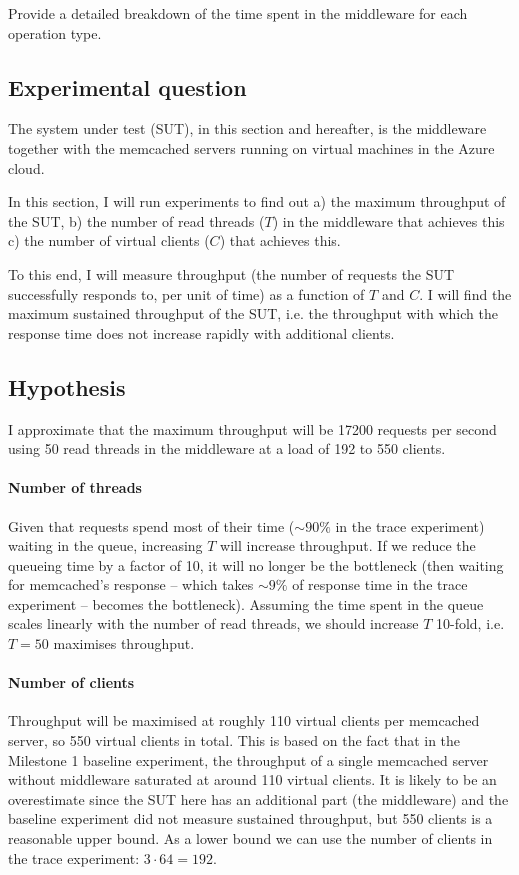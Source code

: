 \documentclass[11pt]{article}
\begin{document}
Provide a detailed breakdown of the time spent in the middleware for each operation type.

\subsection{Experimental question}

The system under test (SUT), in this section and hereafter, is the middleware together with the memcached servers running on virtual machines in the Azure cloud.

In this section, I will run experiments to find out a) the maximum throughput of the SUT, b) the number of read threads ($T$) in the middleware that achieves this c) the number of virtual clients ($C$) that achieves this.

To this end, I will measure throughput (the number of requests the SUT successfully responds to, per unit of time) as a function of $T$ and $C$. I will find the maximum sustained throughput of the SUT, i.e. the throughput with which the response time does not increase rapidly with additional clients.

\subsection{Hypothesis}

I approximate that the maximum throughput will be 17200 requests per second using 50 read threads in the middleware at a load of 192 to 550 clients.

\paragraph{Number of threads} 
Given that requests spend most of their time ($\sim90\%$ in the trace experiment) waiting in the queue, increasing $T$ will increase throughput. If we reduce the queueing time by a factor of 10, it will no longer be the bottleneck (then waiting for memcached's response -- which takes $\sim9\%$ of response time in the trace experiment -- becomes the bottleneck). Assuming the time spent in the queue scales linearly with the number of read threads, we should increase $T$ 10-fold, i.e. $T=50$ maximises throughput.

\paragraph{Number of clients} Throughput will be maximised at roughly 110 virtual clients per memcached server, so 550 virtual clients in total. This is based on the fact that in the Milestone 1 baseline experiment, the throughput of a single memcached server without middleware saturated at around 110 virtual clients. It is likely to be an overestimate since the SUT here has an additional part (the middleware) and the baseline experiment did not measure sustained throughput, but 550 clients is a reasonable upper bound. As a lower bound we can use the number of clients in the trace experiment: $3 \cdot 64=192$.
\end{document}

